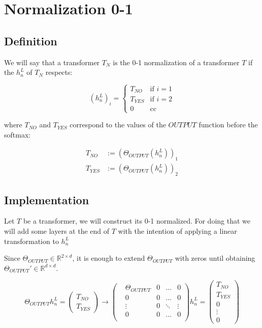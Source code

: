 \section*{Normalization 0-1}

\subsection*{Definition}

We will say that a transformer $T_N$ is the 0-1 normalization of a transformer $T$ if the $h_n^L$ of $T_N$ respects:


\begin{equation*}
(h_n^L)_i =
\begin{cases}
T_{NO} & \text{if } i = 1 \\
T_{YES} & \text{if } i = 2 \\
0 & \text{cc }
\end{cases}
\end{equation*}

where $T_{NO}$ and $T_{YES}$ correspond to the values of the $OUTPUT$ function before the softmax:

\begin{align*}
    T_{NO} &:= (\Theta_{OUTPUT}(h_n^L))_1 \\
    T_{YES} &:= (\Theta_{OUTPUT}(h_n^L))_2 
\end{align*}


\subsection*{Implementation}

Let $T$ be a transformer, we will construct its 0-1 normalized. For doing that we will add some layers at the end of $T$ with the intention of applying a linear transformation to $h_n^L$

Since $\Theta_{OUTPUT} \in \mathbb{R}^{2\times d}$, it is enough to extend $\Theta_{OUTPUT}$ with zeros until obtaining $\Theta_{OUTPUT}' \in \mathbb{R}^{d\times d}$.


\begin{equation*}
    \Theta_{OUTPUT}h_n^L =   
    \left(\begin{matrix}
        T_{NO} \\
        T_{YES}
    \end{matrix}\right) \longrightarrow
    \left(\begin{matrix}
        &\Theta_{OUTPUT} &0 &\dots  &0 \\
        &0                &0 &\dots  &0 \\
        &\vdots           &0 &\ddots &\vdots \\
        &0                &0 &\dots  &0 \\
    \end{matrix}\right)h_n^L = 
    \left(\begin{matrix}
        T_{NO} \\
        T_{YES} \\ 
        0 \\
        \vdots \\
        0
    \end{matrix}\right)
\end{equation*}


